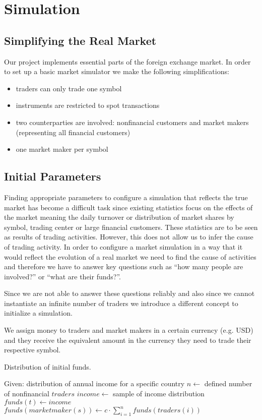 \section{Simulation}

\subsection{Simplifying the Real Market}
Our project implements essential parts of the foreign exchange market.
In order to set up a basic market simulator we make the following
simplifications:

\begin{itemize}
    \item traders can only trade one symbol
    \item instruments are restricted to spot transactions
    \item two counterparties are involved: nonfinancial customers and market makers (representing all financial customers)
    \item one market maker per symbol
\end{itemize}

\subsection{Initial Parameters}
Finding appropriate parameters to configure a simulation that reflects the
true market has become a difficult task since existing statistics focus on 
the effects of the market meaning the daily turnover or distribution of market
shares by symbol, trading center or large financial customers. These statistics
are to be seen as results of trading activities. However, this does not allow
us to infer the cause of trading activity. In order to configure a market
simulation in a way that it would reflect the evolution of a real market we 
need to find the cause of activities and therefore we have to answer key questions
such as ``how many people are involved?'' or ``what are their funds?''.

Since we are not able to answer these questions reliably and also since we cannot
instantiate an infinite number of traders we introduce a different concept to
initialize a simulation.

We assign money to traders and market makers in a certain currency (e.g. USD) and 
they receive the equivalent amount in the currency they need to trade their respective
symbol.

\begin{algorithm}
\caption{Distribution of initial funds.}
\label{alg:initfunds}
\begin{algorithmic}[1]
    \Statex Given: distribution of annual income for a specific country
    \Statex
        \State  $n \gets$ defined number of nonfinancial $traders$
            \State $income \gets$ sample of income distribution
            \State $funds(t) \gets income$
        \EndFor
        \State $funds(marketmaker(s)) \gets c \cdot \sum_{i=1}^n funds(traders(i))$
    \EndFor
\end{algorithmic}
\end{algorithm}

